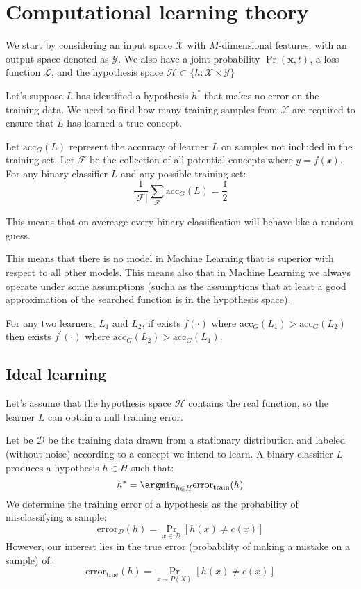 \section{Computational learning theory}

We start by considering an input space $\mathcal{X}$ with $M$-dimensional features, with an output space denoted as $\mathcal{Y}$. 
We also have a joint probability $\Pr(\mathbf{x},t)$, a loss function $\mathcal{L}$, and the hypothesis space $\mathcal{H}\subset\{h:\mathcal{X}\times\mathcal{Y}\}$

Let's suppose $L$ has identified a hypothesis $h^\ast$ that makes no error on the training data. 
We need to find how many training samples from $\mathcal{X}$ are required to ensure that $L$ has learned a true concept. 
\begin{theorem}
    Let $\text{acc}_G(L)$ represent the accuracy of learner $L$ on samples not included in the training set.
    Let $\mathcal{F}$ be the collection of all potential concepts where $y=f(\mathcal{x})$.
    For any binary classifier $L$ and any possible training set:
    \[\dfrac{1}{\left\lvert \mathcal{F} \right\rvert}\sum_{\mathcal{F}}\text{acc}_G(L)=\dfrac{1}{2}\]
\end{theorem}
This means that on avereage every binary classification will behave like a random guess.

This means that there is no model in Machine Learning that is superior with respect to all other models. 
This means also that in Machine Learning we always operate under some assumptions (sucha as the assumptions that at least a good approximation of the searched function is in the hypothesis space). 
\begin{corollary}
    For any two learners, $L_1$ and $L_2$, if exists $f(\cdot)$ where $\text{acc}_G(L_1)>\text{acc}_G(L_2)$ then exists $f^\prime(\cdot)$ where $\text{acc}_G(L_2)>\text{acc}_G(L_1)$. 
\end{corollary}

\subsection{Ideal learning}
Let's assume that the hypothesis space $\mathcal{H}$ contains the real function, so the learner $L$ can obtain a null training error.

Let be $\mathcal{D}$ be the training data drawn from a stationary distribution and labeled (without noise) according to a concept we intend to learn.
A binary classifier $L$ produces a hypothesis $h \in H$ such that: 
\[h^\ast=\argmin_{h\in H}\text{error}_{\text{train}}(h)\]
We determine the training error of a hypothesis as the probability of misclassifying a sample:
\[\text{error}_{\mathcal{D}}(h)=\Pr_{x \in \mathcal{D}}\left[h(x)\neq c(x)\right]\]
However, our interest lies in the true error (probability of making a mistake on a sample) of:
\[\text{error}_{\text{true}}(h)=\Pr_{x \sim P(X)}\left[h(x)\neq c(x)\right]\]

